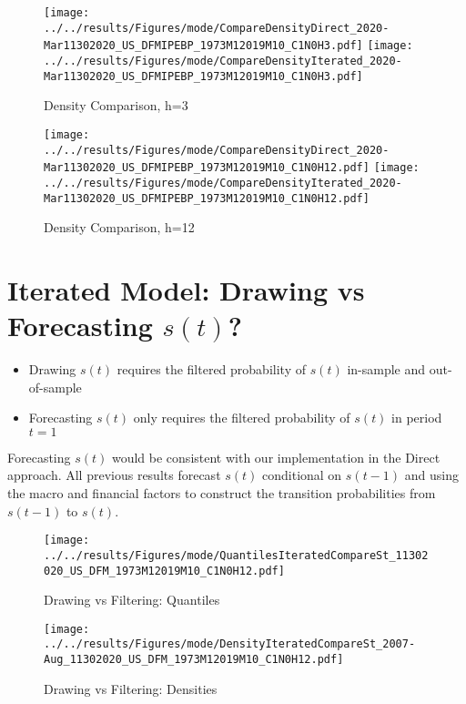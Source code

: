\documentclass[12pt]{article}
\numberwithin{table}{subsection}
\numberwithin{figure}{section}
\begin{document}
\begin{figure}[htb!]
	\caption{Density Comparison, h=3}
	\centering
	\texttt{[image: ../../results/Figures/mode/CompareDensityDirect\_2020-Mar11302020\_US\_DFMIPEBP\_1973M12019M10\_C1N0H3.pdf]}
	\texttt{[image: ../../results/Figures/mode/CompareDensityIterated\_2020-Mar11302020\_US\_DFMIPEBP\_1973M12019M10\_C1N0H3.pdf]}
\end{figure}

\begin{figure}[htb!]
	\caption{Density Comparison, h=12}
	\centering
	\texttt{[image: ../../results/Figures/mode/CompareDensityDirect\_2020-Mar11302020\_US\_DFMIPEBP\_1973M12019M10\_C1N0H12.pdf]}
	\texttt{[image: ../../results/Figures/mode/CompareDensityIterated\_2020-Mar11302020\_US\_DFMIPEBP\_1973M12019M10\_C1N0H12.pdf]}
\end{figure}


\clearpage
\section{Iterated Model: Drawing vs Forecasting $s(t)$? }
\begin{itemize}
	\item Drawing $s(t)$ requires the filtered probability of $s(t)$ in-sample and out-of-sample 
	\item Forecasting $s(t)$ only requires the filtered probability of $s(t)$ in period $t=1$
\end{itemize}

Forecasting $s(t)$ would be consistent with our implementation in the Direct approach. All previous results forecast $s(t)$ conditional on $s(t-1)$ and using the macro and financial factors 
to construct the transition probabilities from $s(t-1)$ to $s(t)$.

\begin{figure}[h!]
	\caption{Drawing vs Filtering: Quantiles}
	\centering
	\texttt{[image: ../../results/Figures/mode/QuantilesIteratedCompareSt\_11302020\_US\_DFM\_1973M12019M10\_C1N0H12.pdf]}	
\end{figure}

\begin{figure}[h!]
	\caption{Drawing vs Filtering: Densities}
	\centering
	\texttt{[image: ../../results/Figures/mode/DensityIteratedCompareSt\_2007-Aug\_11302020\_US\_DFM\_1973M12019M10\_C1N0H12.pdf]}
\end{figure}
\end{document}
